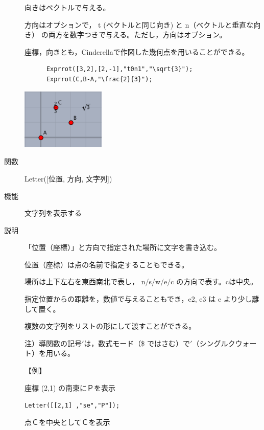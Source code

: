 \documentclass[papersize,a4paper,12pt,uplatex]{jsarticle}
\begin{document}
\begin{description}
向きはベクトルで与える。

方向はオプションで， t (ベクトルと同じ向き) と n（ベクトルと垂直な向き） の両方を数字つきで与える。ただし，方向はオプション。

座標，向きとも，Cinderellaで作図した幾何点を用いることができる。

\begin{verbatim}
      Exprrot([3,2],[2,-1],"t0n1","\sqrt{3}");
      Exprrot(C,B-A,"\frac{2}{3}");
\end{verbatim}

\vspace{\baselineskip}
\hspace{10mm}\includegraphics[bb=0.00 0.00 181.01 131.01,width=4cm]{Fig/exprrot.pdf} \hspace{10mm} 

\vspace{\baselineskip}
\hypertarget{letter}{}\item[関数]  Letter([位置, 方向, 文字列])
\item[機能]  文字列を表示する
\item[説明]  「位置（座標）」と方向で指定された場所に文字を書き込む。

位置（座標）は点の名前で指定することもできる。

場所は上下左右を東西南北で表し， n/s/w/e/c   の方向で表す。cは中央。

指定位置からの距離を，数値で与えることもでき，e2, e3 は e より少し離して置く。

複数の文字列をリストの形にして渡すことができる。

  注）導関数の記号$'$は，数式モード（\$ ではさむ）で$'$（シングルクウォート）を用いる。

\vspace{\baselineskip}
【例】

座標 (2,1) の南東にＰを表示

\hspace{10mm}  \verb|Letter([[2,1] ,"se","P"]);|
        
点Ｃを中央としてＣを表示


\end{description}
\end{document}
